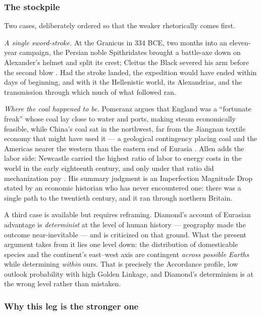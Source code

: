 \documentclass[11pt]{article}
\numberwithin{equation}{section}
\theoremstyle{plain}
\theoremstyle{definition}
\theoremstyle{remark}
\begin{document}
\subsubsection{The stockpile}\label{gc:subsub:stockpile}

Two cases, deliberately ordered so that the weaker rhetorically comes
first.

\emph{A single sword-stroke.} At the Granicus in 334 BCE, two months
into an eleven-year campaign, the Persian noble Spithridates brought a
battle-axe down on Alexander's helmet and split its crest; Cleitus the
Black severed his arm before the second blow \cite{Arrian,
PlutarchAlex}. Had the stroke landed, the expedition would have ended
within days of beginning, and with it the Hellenistic world, its
Alexandrias, and the transmission through which much of what followed
ran.

\emph{Where the coal happened to be.} Pomeranz argues that England was
a ``fortunate freak'' whose coal lay close to water and ports, making
steam economically feasible, while China's coal sat in the northwest,
far from the Jiangnan textile economy that might have used it ---
a geological contingency placing coal and the Americas nearer the
western than the eastern end of Eurasia \cite{Pomeranz00}. Allen adds
the labor side: Newcastle carried the highest ratio of labor to energy
costs in the world in the early eighteenth century, and only under that
ratio did mechanization pay \cite{Allen09}. His summary judgment is
an Imperfection Magnitude Drop stated by an economic historian who has
never encountered one: there was a single path to the twentieth century,
and it ran through northern Britain.

A third case is available but requires reframing. Diamond's account of
Eurasian advantage \cite{Diamond97} is \emph{determinist} at the level
of human history --- geography made the outcome near-inevitable --- and
is criticized on that ground. What the present argument takes from it
lies one level down: the distribution of domesticable species and the
continent's east--west axis are contingent \emph{across possible
Earths} while determining \emph{within} ours. That is precisely the
Accordance profile, low outlook probability with high Golden Linkage,
and Diamond's determinism is at the wrong level rather than mistaken.

\subsubsection{Why this leg is the stronger one}
\label{gc:subsub:strongerleg}
\end{document}
